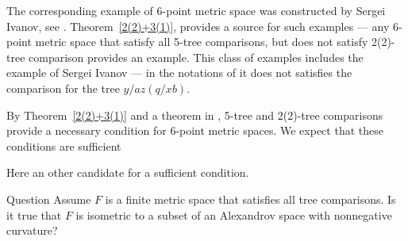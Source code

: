 The corresponding example of 6-point metric space was constructed by Sergei Ivanov, see \cite{AKP}.
Theorem~\ref{2(2)+3(1)}, provides a source for such examples --- any 6-point metric space that satisfy all 5-tree comparisons, but does not satisfy 2(2)-tree comparison provides an example.
This class of examples includes the example of Sergei Ivanov --- in the notations of \cite[7.1]{AKP} it does not satisfies the comparison for the tree $y/az(q/xb)$.

By Theorem~\ref{2(2)+3(1)} and a theorem in \cite{AKP}, 
5-tree and 2(2)-tree comparisons provide a necessary condition for 6-point metric spaces.
We expect that these conditions are sufficient

\begin{center}
\hskip30mm

\end{center}

Here an other candidate for a sufficient condition.

\begin{thm}{Question}\label{quest:all-tree}
Assume $F$ is a finite metric space that satisfies all tree comparisons.
Is it true that $F$ is isometric to a subset of an Alexandrov space with nonnegative curvature?
\end{thm}

